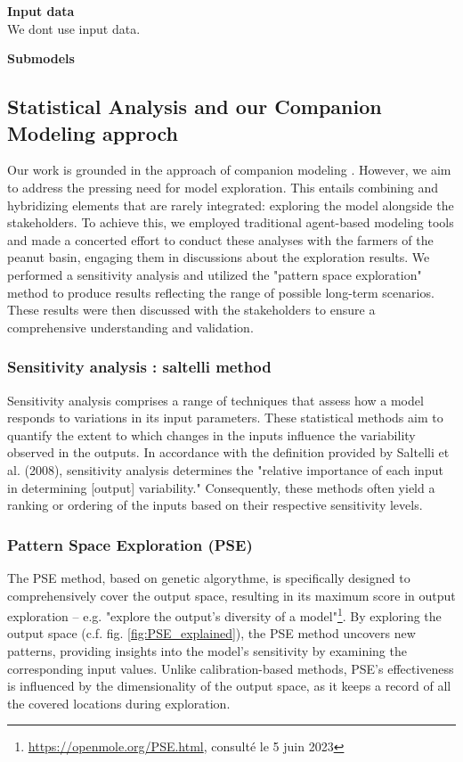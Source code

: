 \documentclass{article}
\begin{document}
        \textbf{Input data}\\

        We dont use input data.

        \textbf{Submodels}\\




\subsection{Statistical Analysis and our Companion Modeling approch}

Our work is grounded in the approach of companion modeling \cite{barreteau_our_2003}. However, we aim to address the pressing need for model exploration. This entails combining and hybridizing elements that are rarely integrated: exploring the model alongside the stakeholders. To achieve this, we employed traditional agent-based modeling tools and made a concerted effort to conduct these analyses with the farmers of the peanut basin, engaging them in discussions about the exploration results. We performed a sensitivity analysis and utilized the "pattern space exploration" method to produce results reflecting the range of possible long-term scenarios. These results were then discussed with the stakeholders to ensure a comprehensive understanding and validation.

    \subsubsection{Sensitivity analysis : saltelli method}

    Sensitivity analysis comprises a range of techniques that assess how a model responds to variations in its input parameters. These statistical methods aim to quantify the extent to which changes in the inputs influence the variability observed in the outputs. In accordance with the definition provided by Saltelli et al. (2008)\cite{saltelli_global_2008}, sensitivity analysis determines the "relative importance of each input in determining [output] variability." Consequently, these methods often yield a ranking or ordering of the inputs based on their respective sensitivity levels.\\

    \subsubsection{Pattern Space Exploration (PSE)}
    The PSE \cite{cherel_beyond_2015}  method, based on genetic algorythme, is specifically designed to comprehensively cover the output space, resulting in its maximum score in output exploration -- e.g. "explore the output's diversity of a model"\footnote{\url{https://openmole.org/PSE.html}, consulté le 5 juin 2023}. By exploring the output space (c.f. fig. \ref{fig:PSE_explained}), the PSE method uncovers new patterns, providing insights into the model's sensitivity by examining the corresponding input values. Unlike calibration-based methods, PSE's effectiveness is influenced by the dimensionality of the output space, as it keeps a record of all the covered locations during exploration.
\end{document}
